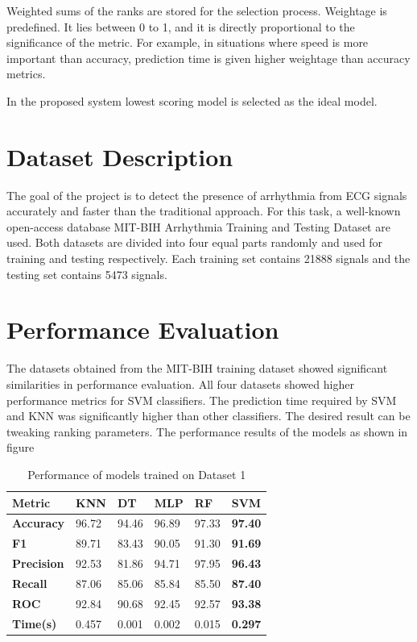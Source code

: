 Weighted sums of the ranks are stored for the selection process. Weightage is predefined. It
lies between 0 to 1, and it is directly proportional to the significance of the metric. For
example, in situations where speed is more important than accuracy, prediction time is given
higher weightage than accuracy metrics.

In the proposed system lowest scoring model is selected as the ideal model.

\section{Dataset Description} \label{sec:dataset_description}
The goal of the project is to detect the presence of arrhythmia from ECG signals accurately and
faster than the traditional approach. For this task, a well-known open-access database MIT-BIH
Arrhythmia Training and Testing Dataset are used. Both datasets are divided into four equal
parts randomly and used for training and testing respectively. Each training set contains
21888 signals and the testing set contains 5473 signals.

\section{Performance Evaluation} \label{sec:performance_evaluation}
The datasets obtained from the MIT-BIH training dataset showed significant similarities in
performance evaluation. All four datasets showed higher performance metrics for SVM
classifiers. The prediction time required by SVM and KNN was significantly higher than other
classifiers. The desired result can be tweaking ranking parameters. The performance results of
the models as shown in figure %

\begin{table}[H]
    \centering
    \caption{Performance of models trained on Dataset 1}\label{tab:performance_of_models_trained_on_dataset_1}
    \begin{tabular}{|p{5em}|C{3em}|C{3em}|C{3em}|C{3em}|C{3em}|}
        \hline
        \textbf{Metric} & \textbf{KNN} & \textbf{DT} & \textbf{MLP} & \textbf{RF} & \textbf{SVM} \\
        \hline
        \textbf{Accuracy} & 96.72 & 94.46 & 96.89 & 97.33 & \textbf{97.40} \\
        \textbf{F1} & 89.71 & 83.43 & 90.05 & 91.30 & \textbf{91.69} \\
        \textbf{Precision} & 92.53 & 81.86 & 94.71 & 97.95 & \textbf{96.43} \\
        \textbf{Recall} & 87.06 & 85.06 & 85.84 & 85.50 & \textbf{87.40} \\
        \textbf{ROC} & 92.84 & 90.68 & 92.45 & 92.57 & \textbf{93.38} \\
        \textbf{Time(s)} & 0.457 & 0.001 & 0.002 & 0.015 & \textbf{0.297} \\
        \hline
    \end{tabular}
\end{table}

